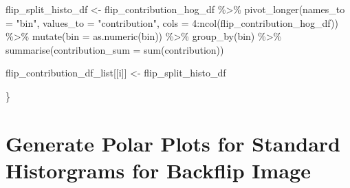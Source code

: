 \documentclass[
  letterpaper,
  DIV=11,
  numbers=noendperiod]{scrreprt}
\newenvironment{Shaded}{\begin{snugshade}}{\end{snugshade}}
\newcommand{\AttributeTok}[1]{\textcolor[rgb]{0.40,0.45,0.13}{#1}}
\newcommand{\DecValTok}[1]{\textcolor[rgb]{0.68,0.00,0.00}{#1}}
\newcommand{\FunctionTok}[1]{\textcolor[rgb]{0.28,0.35,0.67}{#1}}
\newcommand{\NormalTok}[1]{\textcolor[rgb]{0.00,0.23,0.31}{#1}}
\newcommand{\OtherTok}[1]{\textcolor[rgb]{0.00,0.23,0.31}{#1}}
\newcommand{\SpecialCharTok}[1]{\textcolor[rgb]{0.37,0.37,0.37}{#1}}
\newcommand{\StringTok}[1]{\textcolor[rgb]{0.13,0.47,0.30}{#1}}
\begin{document}
\begin{Shaded}
\begin{Highlighting}[]
\NormalTok{  flip\_split\_histo\_df }\OtherTok{\textless{}{-}}
\NormalTok{    flip\_contribution\_hog\_df }\SpecialCharTok{\%\textgreater{}\%}
    \FunctionTok{pivot\_longer}\NormalTok{(}\AttributeTok{names\_to =} \StringTok{"bin"}\NormalTok{,}
                 \AttributeTok{values\_to =} \StringTok{"contribution"}\NormalTok{,}
                 \AttributeTok{cols =} \DecValTok{4}\SpecialCharTok{:}\FunctionTok{ncol}\NormalTok{(flip\_contribution\_hog\_df)) }\SpecialCharTok{\%\textgreater{}\%}
    \FunctionTok{mutate}\NormalTok{(}\AttributeTok{bin =} \FunctionTok{as.numeric}\NormalTok{(bin)) }\SpecialCharTok{\%\textgreater{}\%}
    \FunctionTok{group\_by}\NormalTok{(bin) }\SpecialCharTok{\%\textgreater{}\%}
    \FunctionTok{summarise}\NormalTok{(}\AttributeTok{contribution\_sum =} \FunctionTok{sum}\NormalTok{(contribution))}


\NormalTok{  flip\_contribution\_df\_list[[i]] }\OtherTok{\textless{}{-}}\NormalTok{ flip\_split\_histo\_df}

\NormalTok{\}}
\end{Highlighting}
\end{Shaded}

\section{Generate Polar Plots for Standard Historgrams for Backflip
Image}\label{generate-polar-plots-for-standard-historgrams-for-backflip-image}
\end{document}
